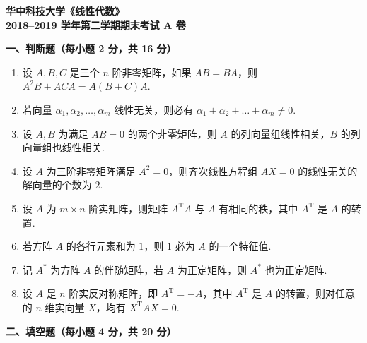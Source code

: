 \documentclass[a4paper,11pt]{ctexart}
\newcommand{\T}{\mathrm{T}}
\begin{document}
\begin{center}
  {\Large\bfseries 华中科技大学《线性代数》}\\[0.4em]
  {\Large\bfseries 2018--2019 学年第二学期期末考试 A 卷}
\end{center}

\vspace{0.8em}

\textbf{一、判断题（每小题 2 分，共 16 分）}

\begin{enumerate}[label=\arabic*., leftmargin=2em, itemsep=0.55em, topsep=0.5em]
  \item 设 $A, B, C$ 是三个 $n$ 阶非零矩阵，如果 $AB = BA$，则 $A^2 B + ACA = A(B + C)A$.

  \item 若向量 $\alpha_1, \alpha_2, \dots, \alpha_m$ 线性无关，则必有 $\alpha_1 + \alpha_2 + \dots + \alpha_m \neq 0$.

  \item 设 $A, B$ 为满足 $AB = 0$ 的两个非零矩阵，则 $A$ 的列向量组线性相关，$B$ 的列向量组也线性相关.

  \item 设 $A$ 为三阶非零矩阵满足 $A^2 = 0$，则齐次线性方程组 $AX = 0$ 的线性无关的解向量的个数为 $2$.

  \item 设 $A$ 为 $m \times n$ 阶实矩阵，则矩阵 $A^{\T}A$ 与 $A$ 有相同的秩，其中 $A^{\T}$ 是 $A$ 的转置.

  \item 若方阵 $A$ 的各行元素和为 $1$，则 $1$ 必为 $A$ 的一个特征值.

  \item 记 $A^*$ 为方阵 $A$ 的伴随矩阵，若 $A$ 为正定矩阵，则 $A^*$ 也为正定矩阵.

  \item 设 $A$ 是 $n$ 阶实反对称矩阵，即 $A^{\T} = -A$，其中 $A^{\T}$ 是 $A$ 的转置，则对任意的 $n$ 维实向量 $X$，均有 $X^{\T}AX = 0$.
\end{enumerate}

\vspace{0.9em}

\textbf{二、填空题（每小题 4 分，共 20 分）}
\end{document}
